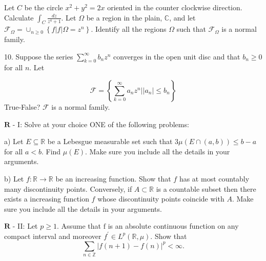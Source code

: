 \documentclass[14pt]{extarticle}
\begin{document}
Let $C$ be the circle $x^{2}+y^{2}=2 x$ oriented in the counter clockwise direction. Calculate $\int_{C} \frac{d z}{z^{4}+1}$.
\newpage
Let $\Omega$ be a region in the plain, $\mathbb{C}$, and let $\mathcal{F}_{\Omega}=\cup_{n \geq 0}\left\{f|f| \Omega=z^{n}\right\}$. Identify all the regions $\Omega$ such that $\mathcal{F}_{\Omega}$ is a normal family.
\newpage

10. Suppose the series $\sum_{k=0}^{\infty} b_{n} z^{n}$ converges in the open unit disc and that $b_{n} \geq 0$ for all $n$. Let

$$
\mathcal{F}=\left\{\sum_{k=0}^{\infty} a_{n} z^{n}|| a_{n} \mid \leq b_{n}\right\}
$$
True-False? $\mathcal{F}$ is a normal family.
\newpage

$\mathbf{R}$ - I: Solve at your choice ONE of the following problems:

a) Let $E \subseteq \mathbb{R}$ be a Lebesgue measurable set such that $3 \mu(E \cap(a, b)) \leq b-a$ for all $a<b$. Find $\mu(E)$. Make sure you include all the details in your arguments.

b) Let $f: \mathbb{R} \rightarrow \mathbb{R}$ be an increasing function. Show that $f$ has at most countably many discontinuity points. Conversely, if $A \subset \mathbb{R}$ is a countable subset then there exists a increasing function $f$ whose discontinuity points coincide with $A$. Make sure you include all the details in your arguments.
\newpage

$\mathbf{R}$ - II: Let $p \geq 1$. Assume that $\mathrm{f}$ is an absolute continuous function on any compact interval and moreover $f^{\prime} \in L^{p}(\mathbb{R}, \mu)$. Show that
$$
\sum_{n \in \mathbb{Z}}|f(n+1)-f(n)|^{p}<\infty .
$$
\newpage
\end{document}
